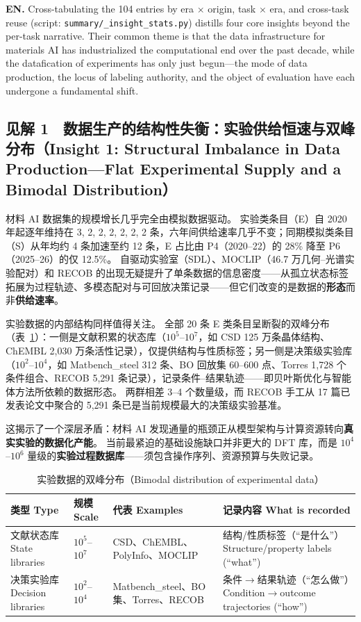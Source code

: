 \documentclass[11pt,a4paper]{ctexart}
\begin{document}
\textbf{EN.} Cross-tabulating the 104 entries by era $\times$ origin, task $\times$ era, and cross-task reuse (script: \texttt{summary/\_insight\_stats.py}) distills four core insights beyond the per-task narrative. Their common theme is that the data infrastructure for materials AI has industrialized the computational end over the past decade, while the datafication of experiments has only just begun---the mode of data production, the locus of labeling authority, and the object of evaluation have each undergone a fundamental shift.

\subsection*{见解 1　数据生产的结构性失衡：实验供给恒速与双峰分布（Insight 1: Structural Imbalance in Data Production---Flat Experimental Supply and a Bimodal Distribution）}

材料 AI 数据集的规模增长几乎完全由模拟数据驱动。
实验类条目（E）自 2020 年起逐年维持在 3, 2, 2, 2, 2, 2, 2 条，六年间供给速率几乎不变；同期模拟类条目（S）从年均约 4 条加速至约 12 条，E 占比由 P4（2020--22）的 28\% 降至 P6（2025--26）的仅 12.5\%。
自驱动实验室（SDL）、MOCLIP（46.7 万几何--光谱实验配对）和 RECOB 的出现无疑提升了单条数据的信息密度——从孤立状态标签拓展为过程轨迹、多模态配对与可回放决策记录——但它们改变的是数据的\textbf{形态}而非\textbf{供给速率}。

实验数据的内部结构同样值得关注。
全部 20 条 E 类条目呈断裂的双峰分布（表~\ref{tab:bimodal}）：一侧是文献积累的状态库（$10^5$--$10^7$，如 CSD 125 万条晶体结构、ChEMBL 2,030 万条活性记录），仅提供结构与性质标签；另一侧是决策级实验库（$10^2$--$10^4$，如 Matbench\_steel 312 条、BO 回放集 60--600 点、Torres 1,728 个条件组合、RECOB 5,291 条记录），记录条件--结果轨迹——即贝叶斯优化与智能体方法所依赖的数据形态。
两群相差 3--4 个数量级，而 RECOB 手工从 17 篇已发表论文中聚合的 5,291 条已是当前规模最大的决策级实验基准。

这揭示了一个深层矛盾：材料 AI 发现通量的瓶颈正从模型架构与计算资源转向\textbf{真实实验的数据化产能}。
当前最紧迫的基础设施缺口并非更大的 DFT 库，而是 $10^4$--$10^6$ 量级的\textbf{实验过程数据库}——须包含操作序列、资源预算与失败记录。

\begin{table}[h]
\centering\small
\caption{实验数据的双峰分布（Bimodal distribution of experimental data）}
\label{tab:bimodal}
\begin{tabular}{@{}p{3.0cm}p{2.0cm}p{5.0cm}p{5.6cm}@{}}
\toprule
类型 Type & 规模 Scale & 代表 Examples & 记录内容 What is recorded \\
\midrule
文献状态库 State libraries & $10^5$--$10^7$ & CSD、ChEMBL、PolyInfo、MOCLIP & 结构/性质标签（``是什么''）Structure/property labels (``what'') \\
决策实验库 Decision libraries & $10^2$--$10^4$ & Matbench\_steel、BO 集、Torres、RECOB & 条件$\to$结果轨迹（``怎么做''）Condition$\to$outcome trajectories (``how'') \\
\bottomrule
\end{tabular}
\end{table}
\end{document}
